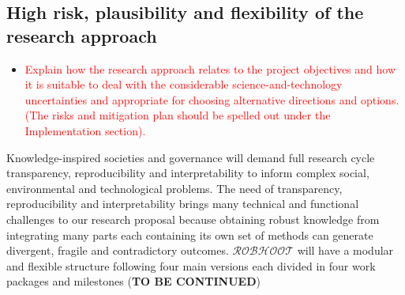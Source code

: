 \documentclass[11pt, a4paper]{article} %
\begin{document}

\subsection{High risk, plausibility and flexibility of the research approach}


\begin{itemize}
\item \textcolor{red}{Explain how the research approach relates to the
    project objectives and how it is suitable to deal with the
    considerable science-and-technology uncertainties and appropriate
    for choosing alternative directions and options. (The risks and
    mitigation plan should be spelled out under the Implementation
    section).}
\end{itemize}

Knowledge-inspired societies and governance will demand full research
cycle transparency, reproducibility and interpretability to inform
complex social, environmental and technological problems. The need of
transparency, reproducibility and interpretability brings many
technical and functional challenges to our research proposal because
obtaining robust knowledge from integrating many parts each containing
its own set of methods can generate divergent, fragile and
contradictory outcomes. {\bf $\mathcal{ROBHOOT}$} will have a modular
and flexible structure following four main versions each divided in
four work packages and milestones ({\bf TO BE CONTINUED})
\end{document}
